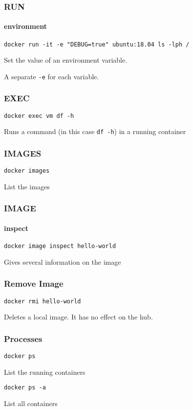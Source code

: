 \begin{frame}[fragile]
\frametitle{RUN}
\framesubtitle{environment}
\begin{lstlisting}
docker run -it -e "DEBUG=true" ubuntu:18.04 ls -lph /
\end{lstlisting}

Set the value of an environment variable.

A separate \lstinline!-e! for each variable.
\end{frame}

\begin{frame}[fragile]
\frametitle{EXEC}
\begin{lstlisting}
docker exec vm df -h
\end{lstlisting}

Runs a command (in this case \lstinline!df -h!) in a running container
\end{frame}


\begin{frame}[fragile]
\frametitle{IMAGES}
\begin{lstlisting}
docker images
\end{lstlisting}

List the images 
\end{frame}

\begin{frame}[fragile]
\frametitle{IMAGE}
\framesubtitle{inspect}
\begin{lstlisting}
docker image inspect hello-world
\end{lstlisting}

Gives several information on the image
\end{frame}


\begin{frame}[fragile]
\frametitle{Remove Image}
\begin{lstlisting}
docker rmi hello-world
\end{lstlisting}

Deletes a local image. It has no effect on the hub.
\end{frame}

\begin{frame}[fragile]
\frametitle{Processes}
\begin{lstlisting}
docker ps
\end{lstlisting}

List the running containers 

\begin{lstlisting}
docker ps -a
\end{lstlisting}

List all containers 
\end{frame}

